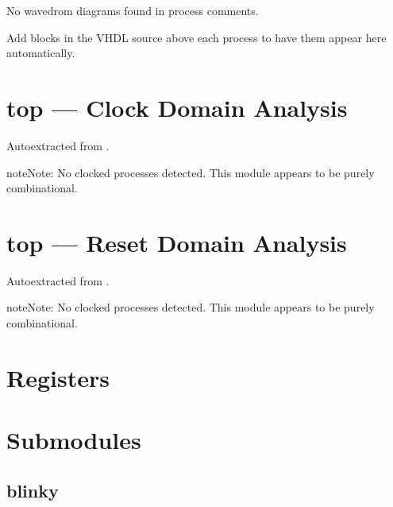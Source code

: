 \documentclass[letterpaper,10pt,english]{sphinxmanual}
\begin{document}
\sphinxAtStartPar
No wavedrom diagrams found in process comments.

\sphinxAtStartPar
Add  blocks in the VHDL source above each
process to have them appear here automatically.

\sphinxstepscope


\section{top — Clock Domain Analysis}
\label{\detokenize{modules/top/cdc:top-clock-domain-analysis}}\label{\detokenize{modules/top/cdc::doc}}
\sphinxAtStartPar
Auto\sphinxhyphen{}extracted from .

\begin{sphinxadmonition}{note}{Note:}
\sphinxAtStartPar
No clocked processes detected. This module appears to be purely combinational.
\end{sphinxadmonition}

\sphinxstepscope


\section{top — Reset Domain Analysis}
\label{\detokenize{modules/top/reset:top-reset-domain-analysis}}\label{\detokenize{modules/top/reset::doc}}
\sphinxAtStartPar
Auto\sphinxhyphen{}extracted from .

\begin{sphinxadmonition}{note}{Note:}
\sphinxAtStartPar
No clocked processes detected. This module appears to be purely combinational.
\end{sphinxadmonition}

\sphinxstepscope


\section{Registers}
\label{\detokenize{registers:registers}}\label{\detokenize{registers::doc}}



\section{Submodules}
\label{\detokenize{modules/top/index:submodules}}
\sphinxstepscope


\subsection{blinky}
\label{\detokenize{modules/blinky/index:blinky}}\label{\detokenize{modules/blinky/index::doc}}
\sphinxstepscope
\end{document}
